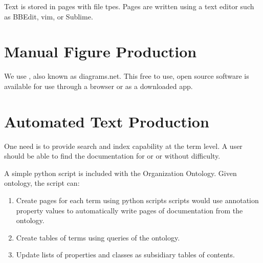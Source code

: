 \documentclass[letterpaper,10pt,english]{sphinxmanual}
\begin{document}
\sphinxAtStartPar
Text is stored in pages with  file tpes.  Pages are written using a text editor
such as BBEdit, vim, or Sublime.


\section{Manual Figure Production}
\label{\detokenize{documentation-authors:manual-figure-production}}
\sphinxAtStartPar
We use , also known as diagrams.net.  This free to use,
open source software is available for use through a browser or as a downloaded
app.


\section{Automated Text Production}
\label{\detokenize{documentation-authors:automated-text-production}}
\sphinxAtStartPar
One need is to provide search and index capability at the term level. A
user should be able to find the documentation for  or  or
 without difficulty.

\sphinxAtStartPar
A simple python script  is included with the Organization
Ontology.  Given  ontology, the script can:
\begin{enumerate}
%
\item {} 
\sphinxAtStartPar
Create pages for each term using python scripts \textendash{} scripts would use annotation
property values to automatically write pages of documentation from the ontology.

\item {} 
\sphinxAtStartPar
Create tables of terms using queries of the ontology.

\item {} 
\sphinxAtStartPar
Update lists of properties and classes as subsidiary tables of contents.

\end{enumerate}
\end{document}
